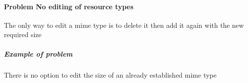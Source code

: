 
\paragraph{Problem No editing of resource types}
	The only way to edit a mime type is to delete it then add it again with the new required size
	\subparagraph{Example of problem}
		There is no option to edit the size of an already established mime type
